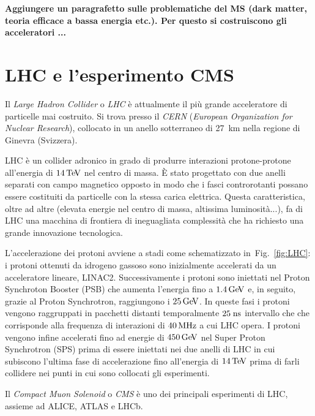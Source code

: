 {\bf Aggiungere un paragrafetto sulle problematiche del MS (dark matter, teoria efficace a bassa energia etc.). Per questo si costruiscono gli acceleratori ...}

\section{LHC e l'esperimento CMS}
Il {\em Large Hadron Collider} o {\em LHC} è attualmente il più grande acceleratore di particelle mai costruito. Si trova presso il {\em CERN} ({\em European Organization for Nuclear Research}), collocato in un anello sotterraneo di 27~km nella regione di Ginevra (Svizzera). 

LHC \`e un collider adronico in grado di produrre interazioni protone-protone all'energia di $14{\rm \, Te\kern-0.125em V}$ nel centro di massa. \`E stato progettato con due anelli separati con campo magnetico opposto in modo che i fasci controrotanti possano essere costituiti da particelle con la stessa carica elettrica. Questa caratteristica, oltre ad altre (elevata energie nel centro di massa, altissima luminosit\`a...), fa di LHC una macchina di frontiera di ineguagliata complessit\`a che ha richiesto una grande innovazione tecnologica. 

L'accelerazione dei protoni avviene a stadi come schematizzato in~Fig.~\ref{fig:LHC}: i protoni ottenuti da idrogeno gassoso sono inizialmente accelerati da un acceleratore lineare, LINAC2. Successivamente i protoni sono iniettati nel Proton Synchroton Booster (PSB) che aumenta l'energia fino a $1.4{\rm \, Ge\kern-0.125em V}$ e, in seguito, grazie al Proton Synchrotron, raggiungono i $25{\rm \, Ge\kern-0.125em V}$. In queste fasi i protoni vengono raggruppati in pacchetti distanti temporalmente $25\rm \; ns$ intervallo che che corrisponde alla frequenza di interazioni di $40{\rm \, MHz}$ a cui LHC opera. 
I protoni vengono infine accelerati fino ad energie di $450{\rm \, Ge\kern-0.125em V}$ nel Super Proton Synchrotron (SPS) prima di essere iniettati nei due anelli di LHC in cui subiscono l'ultima fase di accelerazione fino all'energia di $14{\rm \, Te\kern-0.125em V}$ prima di farli collidere nei punti in cui sono collocati gli esperimenti.

Il {\em Compact Muon Solenoid} o {\em CMS} è uno dei principali esperimenti di LHC, assieme ad ALICE, ATLAS e LHCb. 

